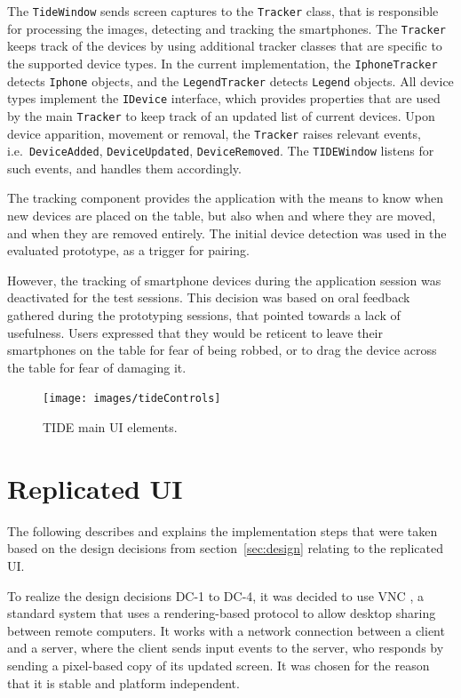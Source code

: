 The \texttt{TideWindow} sends screen captures to the \texttt{Tracker} class, that is responsible for processing the images, detecting and tracking the smartphones.
The \texttt{Tracker} keeps track of the devices by using additional tracker classes that are specific to the supported device types.
In the current implementation, the \texttt{IphoneTracker} detects \texttt{Iphone} objects, and the \texttt{LegendTracker} detects \texttt{Legend} objects.
All device types implement the \texttt{IDevice} interface, which provides properties that are used by the main \texttt{Tracker} to keep track of an updated list of current devices.
Upon device apparition, movement or removal, the \texttt{Tracker} raises relevant events, i.e.\ \texttt{DeviceAdded}, \texttt{DeviceUpdated}, \texttt{DeviceRemoved}.
The \texttt{TIDEWindow} listens for such events, and handles them accordingly.

The tracking component provides the application with the means to know when new devices are placed on the table, but also when and where they are moved, and when they are removed entirely.
The initial device detection was used in the evaluated prototype, as a trigger for pairing.

However, the tracking of smartphone devices during the application session was deactivated for the test sessions.
This decision was based on oral feedback gathered during the prototyping sessions, that pointed towards a lack of usefulness.
Users expressed that they would be reticent to leave their smartphones on the table for fear of being robbed, or to drag the device across the table for fear of damaging it.

\begin{figure}[htb]
  \centering
    \texttt{[image: images/tideControls]}
    \caption{TIDE main UI elements.}
    \label{fig:tideControls}
\end{figure}

\section{Replicated UI}
\label{sec:replicatedui}


The following describes and explains the implementation steps that were taken based on the design decisions from section~\ref{sec:design} relating to the replicated UI.

To realize the design decisions DC-1 to DC-4, it was decided to use VNC \citep{Richardson:1998:vnc}, a standard system that uses a rendering-based protocol to allow desktop sharing between remote computers.
It works with a network connection between a client and a server, where the client sends input events to the server, who responds by sending a pixel-based copy of its updated screen.
It was chosen for the reason that it is stable and platform independent.

